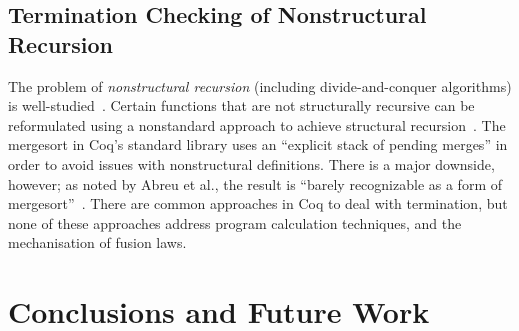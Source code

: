\documentclass[a4paper,anonymous, UKenglish,cleveref, autoref, thm-restate]{lipics-v2021}
\newcommand{\haskell}[1]{\texttt{#1}}
\begin{document}
\subsection{Termination Checking of Nonstructural Recursion}\label{sec:termcheck}


The problem of \emph{nonstructural recursion} (including
divide-and-conquer algorithms) is well-studied~\cite{BoveKS16}.
Certain functions that are not structurally recursive can be reformulated using
a nonstandard approach to achieve structural recursion~\cite{AbreuDHJMS23}.
The mergesort in Coq's standard
library uses an ``explicit stack of pending merges'' in order to avoid issues
with nonstructural definitions. There is a major downside, however; as noted by
Abreu et al., the result is ``barely recognizable as a form of
mergesort''~\cite{AbreuDHJMS23}.
There are common approaches in Coq to deal with termination, but none of these
approaches address program calculation techniques, and the mechanisation of
fusion laws.

\section{Conclusions and Future Work}
\end{document}
